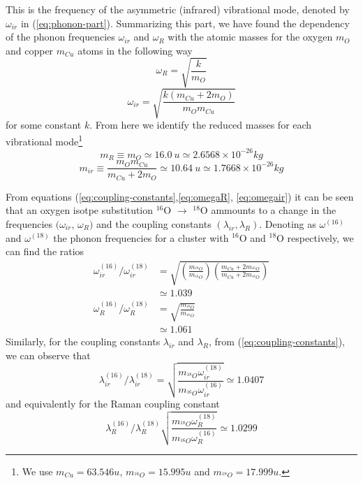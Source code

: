 This is the frequency of the asymmetric (infrared) vibrational mode, denoted by $\omega_{ir}$ in (\ref{eq:phonon-part}).
Summarizing this part, we have found the dependency of the phonon frequencies $\omega_{ir}$ and $\omega_R$ with the atomic masses for the oxygen $m_O$ and copper $m_{Cu}$ atoms in the following way
%
\begin{equation}
  \label{eq:omegaR}
  \omega_{R}= \sqrt{\frac{k}{m_O}}
\end{equation}
%
\begin{equation}
  \label{eq:omegair}
  \omega_{ir} = \sqrt{\frac{k(m_{Cu}+2m_O)}{m_Om_{Cu}}}
\end{equation}
%
for some constant $k$.
From here we identify the reduced masses for each vibrational mode\footnote{We use $m_{Cu}=63.546u$, $m_{^{16}O}=15.995u$ and $m_{^{18}O}=17.999u$.}
%
\begin{equation}
  \label{eq:redMassR}
  m_R \equiv m_O \simeq 16.0\ u \simeq 2.6568 \times 10^{-26} kg
\end{equation}
%
\begin{equation}
  \label{eq:redMassIr}
  m_{ir} \equiv \frac{m_Om_{Cu}}{m_{Cu}+2m_O} \simeq 10.64\ u \simeq 1.7668 \times 10^{-26}kg
\end{equation}

From equations (\ref{eq:coupling-constants},\ref{eq:omegaR}, \ref{eq:omegair}) it can be seen that an oxygen isotpe substitution $^{16}$O $\rightarrow$ $^{18}$O ammounts to a change in the frequencies  $(\omega_{ir}$, $\omega_R)$ and the coupling constants $(\lambda_{ir},\lambda_R)$.
Denoting as $\omega^{(16)}$ and $\omega^{(18)}$ the phonon frequencies for a cluster with $^{16}$O and $^{18}$O respectively, we can find the ratios
%
\begin{align}\label{eq:omega-isot}
  \omega^{(16)}_{ir}/\omega^{(18)}_{ir}
  & =\sqrt{\left(\frac{m_{^{18}O}}{m_{^{16}O}}\right)\left(\frac{m_{Cu}+2m_{^{16}O}}{m_{Cu}+2m_{^{18}O}}\right)} \\
  & \simeq 1.039 \\
  \omega^{(16)}_{R}/\omega^{(18)}_{R}
  & =\sqrt{\frac{m_{^{18}O}}{m_{^{16}O}}} \\
  & \simeq 1.061
\end{align}
%
Similarly, for the coupling constants $\lambda_{ir}$ and $\lambda_R$, from (\ref{eq:coupling-constants}), we can observe that
%
\begin{equation}
  \label{eq:lambda-ir-isot}
  \lambda_{ir}^{(16)}/\lambda_{ir}^{(18)}=\sqrt{\frac{m_{^{18}O}\omega_{ir}^{(18)}}{m_{^{16}O}\omega_{ir}^{(16)}}}\simeq 1.0407
\end{equation}
%
and equivalently for the Raman coupling constant
%
\begin{equation}
  \label{eq:lambda-Ram-isot}
  \lambda_R^{(16)} / \lambda_R^{(18)} \sqrt{\frac{m_{^{18}O}\omega_{R}^{(18)}}{m_{^{16}O}\omega_{R}^{(16)}}} \simeq 1.0299
\end{equation}

